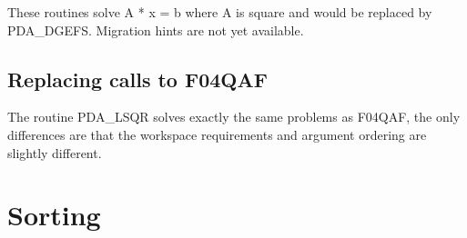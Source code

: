 \documentclass[11pt,twoside]{article}
\newcommand{\htmlref}[2]{#1}
\newcommand{\xlabel}[1]{}
\begin{document}
   These routines solve A * x = b where A is square and would be replaced
   by
\htmlref{PDA\_DGEFS.}{PDA\_DGEFS}
   Migration hints are not yet available.


\subsection{\xlabel{replacing_calls_to_f04qaf}Replacing calls to F04QAF}
   The routine PDA\_LSQR solves exactly the same problems as F04QAF, the
   only differences are that the workspace requirements and argument
   ordering are slightly different.


\section{\xlabel{sorting}Sorting}
\end{document}
